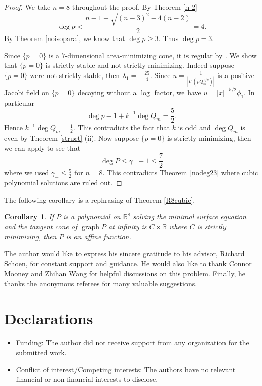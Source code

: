\documentclass[pdflatex,sn-mathphys-num]{sn-jnl}%
\theoremstyle{thmstyleone}%
\newtheorem{corollary}[theorem]{Corollary}
\theoremstyle{thmstyletwo}%
\theoremstyle{thmstylethree}%
\newcommand{\R}{\mathbb{R}}
\DeclareMathOperator{\graph}{graph}
\begin{document}
\begin{proof}
	We take $n=8$ throughout the proof. By Theorem \ref{n-2}
	\begin{equation}\label{rate}
		\deg p < \frac{n-1+\sqrt{(n-3)^2-4(n-2)}}{2}= 4.
	\end{equation}
	By Theorem \ref{noisopara}, we know that $\deg p \ge 3$. Thus $\deg p =3$. 
	
	Since $\{p=0\}$ is a $7$-dimensional area-minimizing cone, it is regular by \cite{Fed70}. We show that $\{p =0\}$ is strictly stable and not strictly minimizing. Indeed suppose $\{p =0\}$ were not strictly stable, then $\lambda_1=-\frac{25}{4}$. Since $u=\frac{1}{|\nabla (p Q_m^{1/k})|}$ is a positive Jacobi field on $\{p=0\}$ decaying without a $\log$ factor, we have $u=|x|^{-5/2}\phi_1$. In particular
	\[\deg p -1+k^{-1}\deg Q_m=\frac{5}{2}.\] Hence $k^{-1}\deg Q_m=\frac{1}{2}$. This contradicts the fact that $k$ is odd and $\deg Q_m$ is even by Theorem \ref{struct} (ii). Now suppose $\{p =0\}$ is strictly minimizing, then we can apply \cite[Theorem 5]{simon1989entire} to see that \[\deg P\le \gamma_{-}+1\le \frac{7}{2}\]where we used $\gamma_-\le \frac{5}{2}$ for $n=8$. This contradicts Theorem \ref{nodeg23} where cubic polynomial solutions are ruled out.
\end{proof}

The following corollary is a rephrasing of Theorem \ref{R8cubic}.
\begin{corollary}
	If $P$ is a polynomial on $\R^8$ solving the minimal surface equation and the tangent cone of $\graph P$ at infinity is $C\times\R$ where $C$ is strictly minimizing, then $P$ is an affine function.
\end{corollary}

	The author would like to express his sincere gratitude to his advisor, Richard Schoen, for constant support and guidance. He would also like to thank Connor Mooney and Zhihan Wang for helpful discussions on this problem. Finally, he thanks the anonymous referees for many valuable suggestions.

\section*{Declarations}
\begin{itemize}
	\item Funding: The author did not receive support from any organization for the submitted work.
	\item Conflict of interest/Competing interests: The authors have no relevant financial or non-financial interests to disclose.
\end{itemize}
\end{document}
